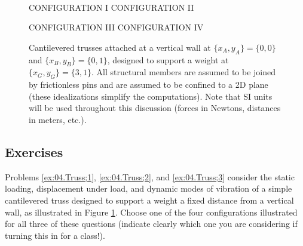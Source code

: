 \clearpage
\begin{figure}[t!]~\vskip-0.2in
\centerline{ \hskip0.2in
            }

\centerline{CONFIGURATION I \hskip2.1in CONFIGURATION II}
\vskip0.1in

\centerline{ \hskip0.2in
            }

\centerline{CONFIGURATION III \hskip2.1in CONFIGURATION IV}
\vskip0.05in

\caption{Cantilevered trusses attached at a vertical wall at
$\{x_A,y_A\}=\{0,0\}$ and $\{x_B,y_B\}=\{0,1\}$, designed to support a
weight at $\{x_G,y_G\}=\{3,1\}$.  All structural members are assumed
to be joined by frictionless pins and are assumed to be confined to a
2D plane (these idealizations simplify the computations).  Note that SI units will be used
throughout this discussion (forces in Newtons, distances in meters,
etc.).}\label{fig:4.trusses}
\end{figure}

\subsection*{Exercises}\label{sec:04.Exercises}

Problems \ref{ex:04.Truss;1}, \ref{ex:04.Truss;2}, and \ref{ex:04.Truss;3} consider the static loading, displacement under load, and dynamic modes of vibration of a simple cantilevered truss designed to support a weight a fixed distance
from a vertical wall, as illustrated in Figure \ref{fig:4.trusses}.  Choose one of the four configurations illustrated for all three of these questions (indicate clearly
which one you are considering if turning this in for a class!).
\vskip-0.1in

